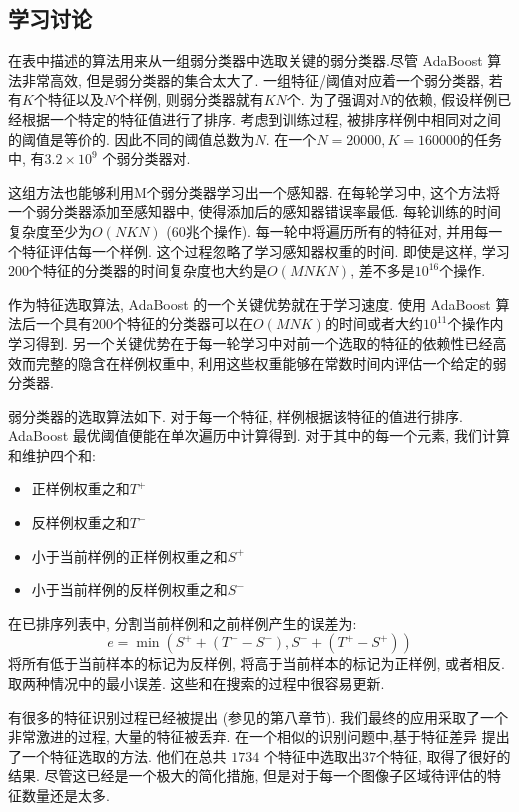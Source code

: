 \documentclass[a4paper,utf8,11pt]{ctexart}
\begin{document}
\subsection{学习讨论}
在表中描述的算法用来从一组弱分类器中选取关键的弱分类器.尽管 AdaBoost 算法非常高效, 但是弱分类器的集合太大了. 一组特征/阈值对应着一个弱分类器, 若有$K$个特征以及$N$个样例, 则弱分类器就有$KN$个. 为了强调对$N$的依赖, 假设样例已经根据一个特定的特征值进行了排序. 考虑到训练过程, 被排序样例中相同对之间的阈值是等价的. 因此不同的阈值总数为$N$. 在一个$N=20000, K=160000$的任务中, 有$3.2\times 10^9$ 个弱分类器对.

这组方法也能够利用M个弱分类器学习出一个感知器\citep{john1994irrelevant}. 在每轮学习中, 这个方法将一个弱分类器添加至感知器中, 使得添加后的感知器错误率最低. 每轮训练的时间复杂度至少为$O(NKN)$ ($60$兆个操作). 每一轮中将遍历所有的特征对, 并用每一个特征评估每一个样例.
这个过程忽略了学习感知器权重的时间. 即使是这样, 学习$200$个特征的分类器的时间复杂度也大约是$O(MNKN)$, 差不多是$10^{16}$个操作.

作为特征选取算法, AdaBoost 的一个关键优势就在于学习速度. 使用 AdaBoost 算法后一个具有$200$个特征的分类器可以在$O(MNK)$的时间或者大约$10^{11}$个操作内学习得到. 另一个关键优势在于每一轮学习中对前一个选取的特征的依赖性已经高效而完整的隐含在样例权重中, 利用这些权重能够在常数时间内评估一个给定的弱分类器.

弱分类器的选取算法如下. 对于每一个特征, 样例根据该特征的值进行排序. AdaBoost 最优阈值便能在单次遍历中计算得到. 对于其中的每一个元素, 我们计算和维护四个和:
\begin{itemize}
\item 正样例权重之和$T^+$
\item 反样例权重之和$T^-$
\item 小于当前样例的正样例权重之和$S^+$
\item 小于当前样例的反样例权重之和$S^-$
\end{itemize}
在已排序列表中, 分割当前样例和之前样例产生的误差为:
\[
e=\min(S^++(T^--S^-),S^-+(T^+-S^+))
\]
将所有低于当前样本的标记为反样例, 将高于当前样本的标记为正样例, 或者相反. 取两种情况中的最小误差. 这些和在搜索的过程中很容易更新.

有很多的特征识别过程已经被提出 (参见\citet{webb1999statistical}的第八章节). 我们最终的应用采取了一个非常激进的过程, 大量的特征被丢弃. 在一个相似的识别问题中,\citet{papageorgiou1998general}基于特征差异
提出了一个特征选取的方法. 他们在总共 $1734$ 个特征中选取出$37$个特征, 取得了很好的结果. 尽管这已经是一个极大的简化措施, 但是对于每一个图像子区域待评估的特征数量还是太多.
\end{document}
